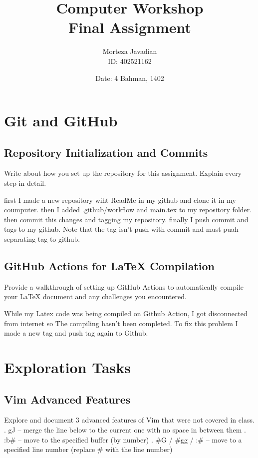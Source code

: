 \documentclass[titlepage]{article}
\title{\huge Computer Workshop\\Final Assignment}
\author{Morteza Javadian\\ID: 402521162}
\date{Date: 4 Bahman, 1402}
\begin{document}
	
	\maketitle
	
	\renewcommand{\contentsname }{ TABLE OF CONTENTS}
	
	\tableofcontents
	\let\LaTeXStandardTableOfContents\tableofcontents
	
	\renewcommand{\tableofcontents}
	{
		\begingroup
		\renewcommand{\bfseries}{\relax}
		\LaTeXStandardTableOfContents
		\endgroup
	}

	\newpage
	
	\section{Git and GitHub}
	\subsection{Repository Initialization and Commits}
	Write about how you set up the repository for this assignment. Explain every step in detail.
	
	first I made a new repository wiht ReadMe in my github and clone it in my coumputer. then I added .github/workflow and main.tex to my repository folder. then commit this changes and tagging my repository. finally I push commit and tags to my github. Note that the tag isn't push with commit and must puah separating tag to github.
	
	\subsection{GitHub Actions for LaTeX Compilation}
	Provide a walkthrough of setting up GitHub Actions to automatically compile your LaTeX document and any challenges you encountered.
	
	While my Latex code was being compiled on Github Action, I got disconnected from internet so The compiling hasn't been completed. To fix this problem I made a new tag and push tag again to Github.
	
	\section{Exploration Tasks}
	\subsection{Vim Advanced Features}
	Explore and document 3 advanced features of Vim that were not covered in class.
	. gJ – merge the line below to the current one with no space in between them
	. :b\#  – move to the specified buffer (by number)
	. \#G / \#gg / :\# – move to a specified line number (replace \# with the line number)
	
\end{document}
